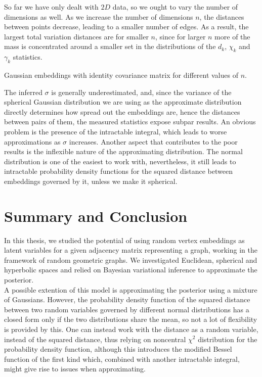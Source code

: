 \documentclass[12pt]{report}
\begin{document}
So far we have only dealt with $2D$ data, so we ought to vary the number of dimensions as well. As we increase the number of dimensions $n$, the distances between points decrease, leading to a smaller number of edges. As a result, the largest total variation distances are for smaller $n$, since for larger $n$ more of the mass is concentrated around a smaller set in the distributions of the $d_k$, $\chi_k$ and $\gamma_k$ statistics. \\
\begin{table}[!ht]
    \centering
    \tiny
    \caption[Multiple ms]{Gaussian embeddings with identity covariance matrix for different values of $n$.}
\end{table}

The inferred $\sigma$ is generally underestimated, and, since the variance of the spherical Gaussian distribution we are using as the approximate distribution directly determines how spread out the embeddings are, hence the distances between pairs of them, the measured statistics expose subpar results. An obvious problem is the presence of the intractable integral, which leads to worse approximations as $\sigma$ increases. Another aspect that contributes to the poor results is the inflexible nature of the approximating distribution. The normal distribution is one of the easiest to work with, nevertheless, it still leads to intractable probability density functions for the squared distance between embeddings governed by it, unless we make it spherical. \\

\chapter{Summary and Conclusion}
In this thesis, we studied the potential of using random vertex embeddings as latent variables for a given adjacency matrix representing a graph, working in the framework of random geometric graphs. We investigated Euclidean, spherical and hyperbolic spaces and relied on Bayesian variational inference to approximate the posterior. \\

A possible extention of this model is approximating the posterior using a mixture of Gaussians. However, the probability density function of the squared distance between two random variables governed by different normal distributions has a closed form only if the two distributions share the mean, so not a lot of flexibility is provided by this. One can instead work with the distance as a random variable, instead of the squared distance, thus relying on noncentral $\chi^2$ distribution for the probability density function, although this introduces the modified Bessel function of the first kind which, combined with another intractable integral, might give rise to issues when approximating. \\
\end{document}
